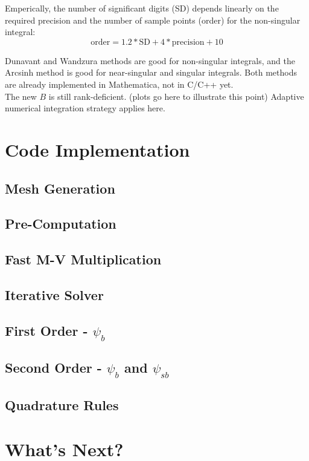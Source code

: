 \documentclass [10pt,letterpaper]{article}
\begin{document}
Emperically, the number of significant digits (SD) depends linearly on the 
required precision and the number of sample points (order) for the non-singular integral:
\begin{equation}
	\text{order}
	=	
		1.2*
		\text{SD} 
		+
		4*
		\text{precision}
		+10
\end{equation}

Dunavant and Wandzura methods are good for non-singular integrals,
and the Arcsinh method is good for near-singular and singular integrals.
Both methods are already implemented in Mathematica, not in C/C++ yet.
\\

The new $B$ is still rank-deficient. (plots go here to illustrate this point)
Adaptive numerical integration strategy applies here.



\section{Code Implementation}
\label{sec:code-implementation}
\subsection{Mesh Generation}
\label{sub:mesh-generation}
\subsection{Pre-Computation}
\label{sub:pre-computation}
\subsection{Fast M-V Multiplication}
\label{sub:fast-M-V-multiplication}
\subsection{Iterative Solver}
\label{sub:iterative-solver}
\subsection{First Order - $\psi_b$}
\label{sub:first-order-psib}
\subsection{Second Order - $\psi_b$ and $\psi_{sb}$}
\label{sub:second-order-psib-and-psisb} 
\subsection{Quadrature Rules}
\label{sub:quadrature-rules}
\section{What's Next?}
\label{sec:whats-next}
\end{document}
